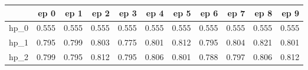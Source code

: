 \begin{tabular}{lrrrrrrrrrr}
\toprule
{} &   ep 0 &   ep 1 &   ep 2 &   ep 3 &   ep 4 &   ep 5 &   ep 6 &   ep 7 &   ep 8 &   ep 9 \\
\midrule
hp\_0 &  0.555 &  0.555 &  0.555 &  0.555 &  0.555 &  0.555 &  0.555 &  0.555 &  0.555 &  0.555 \\
hp\_1 &  0.795 &  0.799 &  0.803 &  0.775 &  0.801 &  0.812 &  0.795 &  0.804 &  0.821 &  0.801 \\
hp\_2 &  0.799 &  0.795 &  0.812 &  0.795 &  0.806 &  0.801 &  0.788 &  0.797 &  0.806 &  0.812 \\
\bottomrule
\end{tabular}
